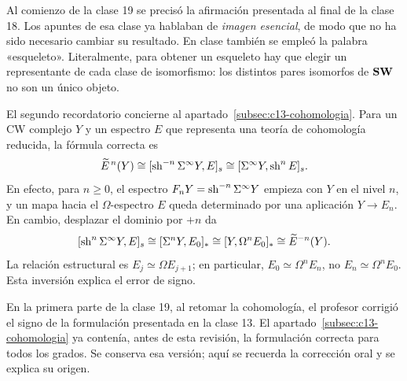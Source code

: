 \begin{nota}
Al comienzo de la clase 19 se precisó la afirmación presentada al final de la clase 18. Los apuntes de esa clase ya hablaban de \emph{imagen esencial}, de modo que no ha sido necesario cambiar su resultado. En clase también se empleó la palabra «esqueleto». Literalmente, para obtener un esqueleto hay que elegir un representante de cada clase de isomorfismo: los distintos pares isomorfos de $\mathbf{SW}$ no son un único objeto.
\end{nota}

El segundo recordatorio concierne al apartado~\ref{subsec:c13-cohomologia}. Para un CW complejo $Y$ y un espectro $E$ que representa una teoría de cohomología reducida, la fórmula correcta es
\[
\widetilde E^{\,n}(Y)\cong[\operatorname{sh}^{-n}\Sigma^\infty Y,E]_s
\cong[\Sigma^\infty Y,\operatorname{sh}^nE]_s.
\]
En efecto, para $n\ge0$, el espectro $F_nY=\operatorname{sh}^{-n}\Sigma^\infty Y$ empieza con $Y$ en el nivel $n$, y un mapa hacia el $\Omega$-espectro $E$ queda determinado por una aplicación $Y\to E_n$. En cambio, desplazar el dominio por $+n$ da
\[
[\operatorname{sh}^n\Sigma^\infty Y,E]_s
\cong[\Sigma^nY,E_0]_*
\cong[Y,\Omega^nE_0]_*
\cong\widetilde E^{-n}(Y).
\]
La relación estructural es $E_j\simeq\Omega E_{j+1}$; en particular, $E_0\simeq\Omega^nE_n$, no $E_n\simeq\Omega^nE_0$. Esta inversión explica el error de signo.

\begin{nota}
En la primera parte de la clase 19, al retomar la cohomología, el profesor corrigió el signo de la formulación presentada en la clase 13. El apartado~\ref{subsec:c13-cohomologia} ya contenía, antes de esta revisión, la formulación correcta para todos los grados. Se conserva esa versión; aquí se recuerda la corrección oral y se explica su origen.
\end{nota}

